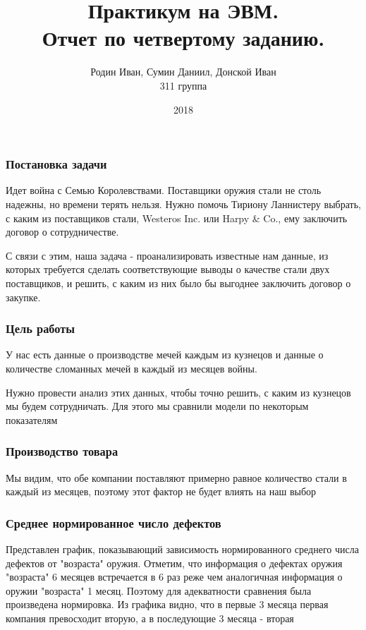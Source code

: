 \documentclass[8pt]{beamer}
\title{Практикум на ЭВМ.\\ Отчет по четвертому заданию.}
\author{ Родин Иван, Сумин Даниил, Донской Иван\\ 311 группа}
\institute{Московский государственный университет им. Ломоносова}
\date{2018}
\begin{document}
 
\frame{\titlepage}
 
\begin{frame}
\frametitle{Постановка задачи}

Идет война с Семью Королевствами. Поставщики оружия стали не столь надежны, но времени терять нельзя. Нужно помочь Тириону Ланнистеру выбрать, с каким из поставщиков стали, Westeros Inc. или Harpy & Co., ему заключить договор о сотрудничестве.\\

\bigskip

С связи с этим, наша задача - проанализировать известные нам данные, из которых требуется сделать соответствующие выводы о качестве стали двух поставщиков, и решить, с каким из них было бы выгоднее заключить договор о закупке.\\
\end{frame}
 
\begin{frame}
\frametitle{Цель работы}
У нас есть данные о производстве мечей каждым из кузнецов и данные о количестве сломанных мечей в каждый из месяцев войны.

\bigskip

Нужно провести анализ этих данных, чтобы точно решить, с каким из кузнецов мы будем сотрудничать. Для этого мы сравнили модели по некоторым показателям
\end{frame}

\begin{frame}
\frametitle{Производство товара\\}
\begin{figure}[h]
\end{figure}
\bigskip
Мы видим, что обе компании поставляют примерно равное количество стали в каждый из месяцев, поэтому этот фактор не будет влиять на наш выбор


\end{frame}

\begin{frame}
\frametitle{Среднее нормированное число дефектов }
\begin{figure}[h]
\end{figure}
Представлен график, показывающий зависимость нормированного среднего числа дефектов от "возраста" оружия. Отметим, что информация о дефектах оружия "возраста" 6 месяцев встречается в 6 раз реже чем аналогичная информация о оружии "возраста" 1 месяц. Поэтому для адекватности сравнения была произведена нормировка.
Из графика видно, что в первые 3 месяца первая компания превосходит вторую, а в последующие 3 месяца - вторая

\end{frame}
\end{document}
